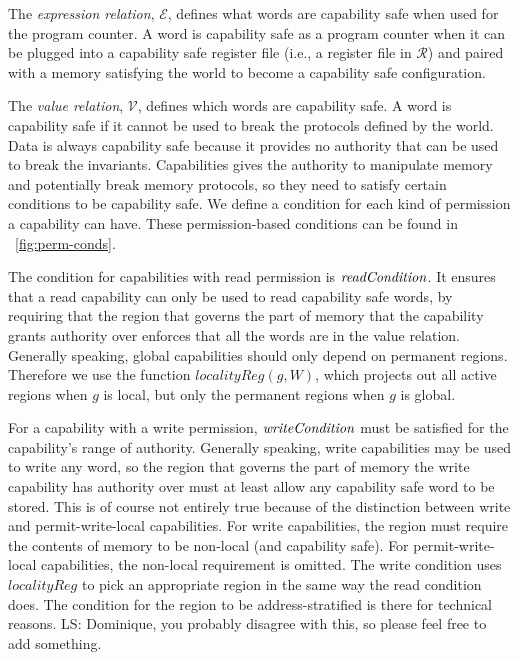\documentclass[compsoc,conference,letterpaper,fleqn]{IEEEtran}
\newcommand\lau[1]{{\color{purple} \sf \footnotesize {LS: #1}}\\}
\newcommand{\var}[1]{\mathit{#1}}
\newcommand{\plainfun}[2]{
  \ifthenelse{\equal{#2}{}}
  {\mathit{#1}}
  {\mathit{#1}(#2)}
}
\newcommand{\readCond}[1]{\plainfun{readCondition}{#1}}
\newcommand{\writeCond}[1]{\plainfun{writeCondition}{#1}}
\newcommand{\asmType}{\plaindom{AsmType}}
\newcommand{\plaindom}[1]{\mathrm{#1}}
\newcommand{\intr}[2]{\mathcal{#1}}
\newcommand{\valueintr}[1]{\intr{V}{#1}}
\newcommand{\exprintr}[1]{\intr{E}{#1}}
\newcommand{\regintr}[1]{\intr{R}{#1}}
\newcommand{\stdvr}{\valueintr{\asmType}}
\newcommand{\stder}{\exprintr{\asmType}}
\newcommand{\stdrr}{\regintr{\asmType}}
\begin{document}
The \emph{expression relation}, $\stder$, defines what words are
capability safe when used for the program counter. A word is
capability safe as a program counter when it can be plugged into a
capability safe register file (i.e., a register file in $\stdrr$) and
paired with a memory satisfying the world to become a capability safe
configuration.

The \emph{value relation}, $\stdvr$, defines which words are capability
safe. A word is capability safe if it cannot be used to break the
protocols defined by the world. Data is always capability safe because
it provides no authority that can be used to break the
invariants. Capabilities gives the authority to manipulate memory and
potentially break memory protocols, so they need to satisfy certain
conditions to be capability safe. We define a condition for each kind
of permission a capability can have. These permission-based conditions
can be found in \figurename~\ref{fig:perm-conds}. 

The condition for capabilities with read permission is
$\readCond{}$. It ensures that a read capability can only be used to
read capability safe words, by requiring that the region that governs
the part of memory that the capability grants authority over enforces
that all the words are in the value relation. Generally speaking,
global capabilities should only depend on permanent regions. Therefore
we use the function $\var{localityReg}(g,W)$, which projects out all
active regions when $g$ is local, but only the permanent regions when
$g$ is global.

For a capability with a write permission, $\writeCond{}$ must be
satisfied for the capability's range of authority. Generally speaking,
write capabilities may be used to write any word, so the region that
governs the part of memory the write capability has authority over
must at least allow any capability safe word to be stored.
This is of course not entirely true because of the distinction between
write and permit-write-local capabilities. For write capabilities, the
region must require the contents of memory to be non-local (and
capability safe). For permit-write-local capabilities, the
non-local requirement is omitted.
The write condition uses $\var{localityReg}$ to pick an appropriate
region in the same way the read condition does.
The condition for the region to be address-stratified is there for
technical reasons.\lau{Dominique, you probably disagree with this, so
  please feel free to add something.}
\end{document}
